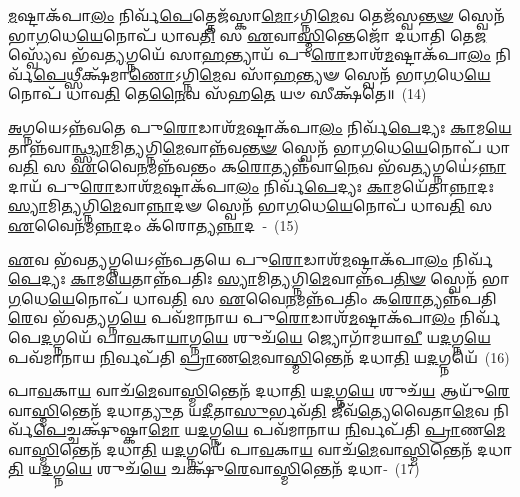 \-\ul{𑌮}\-𑌷𑍍𑌟𑌾\-𑌕᳴𑌪𑌾\-\ul{𑌲𑌂} 𑌨𑌿𑌰𑍍𑌵᳴\-\ul{𑌪𑍇}\-𑌤𑍍𑌤𑍇𑌜᳴𑌸𑍍𑌕𑌾\-\ul{𑌮𑍋}\-\-𑌽𑌗𑍍𑌨𑌿\-\ul{𑌮𑍇}\-𑌵 𑌤𑍇𑌜᳴𑌸𑍍𑌵\-\ul{𑌨𑍍𑌤}\-\-\ul{𑍟} 𑌸𑍍𑌵𑍇𑌨᳴ 𑌭𑌾\-\ul{𑌗}\-𑌧𑍇\-\ul{𑌯𑍇}\-𑌨𑍋𑌪᳴ 𑌧𑌾𑌵\-\ul{𑌤𑌿} 𑌸 \ul{𑌏}\-𑌵𑌾\-\ul{𑌸𑍍𑌮𑌿}\-𑌨𑍍𑌤𑍇𑌜𑍋᳴ 𑌦𑌧𑌾𑌤𑌿 𑌤𑍇\-\ul{𑌜}\-𑌸𑍍𑌵𑍍𑌯𑍇᳴𑌵 𑌭᳴𑌵\-\ul{𑌤𑍍𑌯}\-𑌗𑍍𑌨𑌯𑍇᳴ 𑌸𑌾\-\ul{𑌹}\-𑌨𑍍𑌤𑍍𑌯𑌾𑌯᳴ 𑌪𑍁\-\ul{𑌰𑍋}\-𑌡𑌾𑌶᳴\-\-\ul{𑌮}\-𑌷𑍍𑌟𑌾\-𑌕᳴𑌪𑌾\-\ul{𑌲𑌂} 𑌨𑌿𑌰𑍍𑌵᳴\-\ul{𑌪𑍇}\-𑌥𑍍𑌸𑍀𑌕𑍍𑌷᳴𑌮𑌾\-\ul{𑌣𑍋}\-\-𑌽𑌗𑍍𑌨𑌿\-\ul{𑌮𑍇}\-𑌵 𑌸𑌾᳴\-\ul{𑌹}\-𑌨𑍍𑌤𑍍𑌯𑍟 𑌸𑍍𑌵𑍇𑌨᳴ 𑌭𑌾\-\ul{𑌗}\-𑌧𑍇\-\ul{𑌯𑍇}\-𑌨𑍋𑌪᳴ 𑌧𑌾𑌵\-\ul{𑌤𑌿} 𑌤𑍇\-\ul{𑌨𑍈}\-𑌵 𑌸᳴𑌹\-\ul{𑌤𑍇} 𑌯𑍞 𑌸𑍀𑌕𑍍𑌷᳴𑌤𑍇॥~(14)

{\anuvakamend[{𑌭𑍍𑌰𑌾𑌤𑍃᳴𑌵𑍍𑌯𑌸𑍍𑌯𑌾\-\ul{𑌸𑍍𑌮𑌿}\-𑌨𑍍𑌤𑍇𑌜᳴𑌸𑍍𑌵𑌤𑍇 𑌪𑍁\-\ul{𑌰𑍋}\-𑌡𑌾𑌶᳴\-\-\ul{𑌮}\-𑌷𑍍𑌟𑌾𑌤𑍍𑌰𑌿𑍞᳴𑌶𑌚𑍍𑌚}]}%

\-\ul{𑌅}\-𑌗𑍍𑌨𑌯𑍇\-𑌽𑌨𑍍𑌨᳴𑌵𑌤𑍇 𑌪𑍁\-\ul{𑌰𑍋}\-𑌡𑌾𑌶᳴\-\-\ul{𑌮}\-𑌷𑍍𑌟𑌾\-𑌕᳴𑌪𑌾\-\ul{𑌲𑌂} 𑌨𑌿𑌰𑍍𑌵᳴\-\ul{𑌪𑍇}\-𑌦𑍍𑌯𑌃 \ul{𑌕𑌾}\-𑌮\-\ul{𑌯𑍇}\-𑌤𑌾𑌨𑍍𑌨᳴\-𑌵𑌾\-\ul{𑌨𑍍𑌥𑍍𑌸𑍍𑌯𑌾}\-𑌮𑌿\-\ul{𑌤𑍍𑌯}\-𑌗𑍍𑌨𑌿\-\-\ul{𑌮𑍇}\-𑌵𑌾𑌨𑍍𑌨᳴𑌵\-\ul{𑌨𑍍𑌤}\-\-\ul{𑍟} 𑌸𑍍𑌵𑍇𑌨᳴ 𑌭𑌾\-\ul{𑌗}\-𑌧𑍇\-\ul{𑌯𑍇}\-𑌨𑍋𑌪᳴ 𑌧𑌾𑌵\-\ul{𑌤𑌿} 𑌸 \ul{𑌏}\-𑌵𑍈\-\ul{𑌨}\-𑌮𑌨𑍍𑌨᳴𑌵𑌨𑍍𑌤𑌂 𑌕\-\ul{𑌰𑍋}\-𑌤𑍍𑌯𑌨𑍍𑌨᳴𑌵𑌾\-\ul{𑌨𑍇}\-𑌵 𑌭᳴𑌵\-\ul{𑌤𑍍𑌯}\-𑌗𑍍𑌨𑌯𑍇॑\-𑌽\-\ul{𑌨𑍍𑌨𑌾}\-𑌦𑌾𑌯᳴ 𑌪𑍁\-\ul{𑌰𑍋}\-𑌡𑌾𑌶᳴\-\-\ul{𑌮}\-𑌷𑍍𑌟𑌾𑌕᳴𑌪𑌾\-\ul{𑌲𑌂} 𑌨𑌿𑌰𑍍𑌵᳴\-\ul{𑌪𑍇}\-𑌦𑍍𑌯𑌃 \ul{𑌕𑌾}\-𑌮𑌯𑍇᳴𑌤𑌾\-\ul{𑌨𑍍𑌨𑌾}\-𑌦𑌃 \ul{𑌸𑍍𑌯𑌾}\-𑌮𑌿\-\ul{𑌤𑍍𑌯}\-𑌗𑍍𑌨𑌿\-\ul{𑌮𑍇}\-𑌵𑌾\-\ul{𑌨𑍍𑌨𑌾}\-𑌦𑍟 𑌸𑍍𑌵𑍇𑌨᳴ 𑌭𑌾\-\ul{𑌗}\-𑌧𑍇\-\ul{𑌯𑍇}\-𑌨𑍋𑌪᳴ 𑌧𑌾𑌵\-\ul{𑌤𑌿} 𑌸 \ul{𑌏}\-𑌵𑍈𑌨᳴𑌮\-\ul{𑌨𑍍𑌨𑌾}\-𑌦𑌂 𑌕᳴𑌰𑍋𑌤𑍍𑌯\-\ul{𑌨𑍍𑌨𑌾}\-𑌦~-~(15)

\-\ul{𑌏}\-𑌵 𑌭᳴𑌵\-\ul{𑌤𑍍𑌯}\-𑌗𑍍𑌨𑌯𑍇\-𑌽𑌨𑍍𑌨᳴𑌪𑌤𑌯𑍇 𑌪𑍁\-\ul{𑌰𑍋}\-𑌡𑌾𑌶᳴\-\-\ul{𑌮}\-𑌷𑍍𑌟𑌾\-𑌕᳴𑌪𑌾\-\ul{𑌲𑌂} 𑌨𑌿𑌰𑍍𑌵᳴\-\ul{𑌪𑍇}\-𑌦𑍍𑌯𑌃 \ul{𑌕𑌾}\-𑌮\-\ul{𑌯𑍇}\-𑌤𑌾𑌨𑍍𑌨᳴𑌪𑌤𑌿𑌃 \ul{𑌸𑍍𑌯𑌾}\-𑌮𑌿\-\ul{𑌤𑍍𑌯}\-𑌗𑍍𑌨𑌿\-\ul{𑌮𑍇}\-𑌵𑌾𑌨𑍍𑌨᳴𑌪\-\ul{𑌤𑌿}\-\-\ul{𑍟} 𑌸𑍍𑌵𑍇𑌨᳴ 𑌭𑌾\-\ul{𑌗}\-𑌧𑍇\-\ul{𑌯𑍇}\-𑌨𑍋𑌪᳴ 𑌧𑌾𑌵\-\ul{𑌤𑌿} 𑌸 \ul{𑌏}\-𑌵𑍈\-\ul{𑌨}\-𑌮𑌨𑍍𑌨᳴𑌪𑌤𑌿𑌂 𑌕\-\ul{𑌰𑍋}\-𑌤𑍍𑌯𑌨𑍍𑌨᳴𑌪𑌤𑌿\-\ul{𑌰𑍇}\-𑌵 𑌭᳴𑌵\-\ul{𑌤𑍍𑌯}\-𑌗𑍍𑌨\-\ul{𑌯𑍇} 𑌪𑌵᳴𑌮𑌾𑌨𑌾𑌯 𑌪𑍁\-\ul{𑌰𑍋}\-𑌡𑌾𑌶᳴\-\-\ul{𑌮}\-𑌷𑍍𑌟𑌾\-𑌕᳴𑌪𑌾\-\ul{𑌲𑌂} 𑌨𑌿𑌰𑍍𑌵᳴𑌪𑍇\-\ul{𑌦}\-𑌗𑍍𑌨𑌯𑍇᳴ 𑌪𑌾\-\ul{𑌵}\-𑌕𑌾\-\ul{𑌯𑌾}\-𑌗𑍍𑌨\-\ul{𑌯𑍇} 𑌶𑍁𑌚᳴\-\ul{𑌯𑍇} 𑌜𑍍𑌯𑍋𑌗𑌾᳴𑌮𑌯𑌾\-\ul{𑌵𑍀} 𑌯\-\ul{𑌦}\-𑌗𑍍𑌨\-\ul{𑌯𑍇} 𑌪𑌵᳴𑌮𑌾𑌨𑌾𑌯 \ul{𑌨𑌿}\-𑌰𑍍𑌵𑌪᳴𑌤𑌿 \ul{𑌪𑍍𑌰𑌾}\-𑌣\-\ul{𑌮𑍇}\-𑌵𑌾\-\ul{𑌸𑍍𑌮𑌿}\-𑌨𑍍𑌤𑍇𑌨᳴ 𑌦𑌧𑌾\-\ul{𑌤𑌿} 𑌯\-\ul{𑌦}\-𑌗𑍍𑌨𑌯𑍇᳴~(16)

𑌪𑌾\-\ul{𑌵}\-𑌕𑌾\-\ul{𑌯} 𑌵𑌾𑌚᳴\-\ul{𑌮𑍇}\-𑌵𑌾\-\ul{𑌸𑍍𑌮𑌿}\-𑌨𑍍𑌤𑍇𑌨᳴ 𑌦𑌧𑌾\-\ul{𑌤𑌿} 𑌯\-\ul{𑌦}\-𑌗𑍍𑌨\-\ul{𑌯𑍇} 𑌶𑍁𑌚᳴\-\ul{𑌯} 𑌆𑌯𑍁᳴\-\ul{𑌰𑍇}\-𑌵𑌾\-\ul{𑌸𑍍𑌮𑌿}\-𑌨𑍍𑌤𑍇𑌨᳴ 𑌦𑌧𑌾\-\ul{𑌤𑍍𑌯𑍁}\-𑌤 𑌯\-\ul{𑌦𑍀}\-𑌤𑌾\-\ul{𑌸𑍁}\-𑌰𑍍𑌭𑌵᳴\-\ul{𑌤𑌿} 𑌜𑍀𑌵᳴\-\ul{𑌤𑍍𑌯𑍇}\-𑌵𑍈𑌤𑌾\-\ul{𑌮𑍇}\-𑌵 𑌨𑌿𑌰𑍍𑌵᳴\-\ul{𑌪𑍇}\-𑌚𑍍𑌚𑌕𑍍𑌷𑍁᳴𑌷𑍍𑌕𑌾\-\ul{𑌮𑍋} 𑌯\-\ul{𑌦}\-𑌗𑍍𑌨\-\ul{𑌯𑍇} 𑌪𑌵᳴𑌮𑌾𑌨𑌾𑌯 \ul{𑌨𑌿}\-𑌰𑍍𑌵𑌪᳴𑌤𑌿 \ul{𑌪𑍍𑌰𑌾}\-𑌣\-\ul{𑌮𑍇}\-𑌵𑌾\-\-\ul{𑌸𑍍𑌮𑌿}\-𑌨𑍍𑌤𑍇𑌨᳴ 𑌦𑌧𑌾\-\ul{𑌤𑌿} 𑌯\-\ul{𑌦}\-𑌗𑍍𑌨𑌯𑍇᳴ 𑌪𑌾\-\ul{𑌵}\-𑌕𑌾\-\ul{𑌯} 𑌵𑌾𑌚᳴\-\ul{𑌮𑍇}\-𑌵𑌾\-\ul{𑌸𑍍𑌮𑌿}\-𑌨𑍍𑌤𑍇𑌨᳴ 𑌦𑌧𑌾\-\ul{𑌤𑌿} 𑌯\-\ul{𑌦}\-𑌗𑍍𑌨\-\ul{𑌯𑍇} 𑌶𑍁𑌚᳴\-\ul{𑌯𑍇} 𑌚𑌕𑍍𑌷𑍁᳴\-\ul{𑌰𑍇}\-𑌵𑌾\-\ul{𑌸𑍍𑌮𑌿}\-𑌨𑍍𑌤𑍇𑌨᳴ 𑌦𑌧𑌾-~(17)

